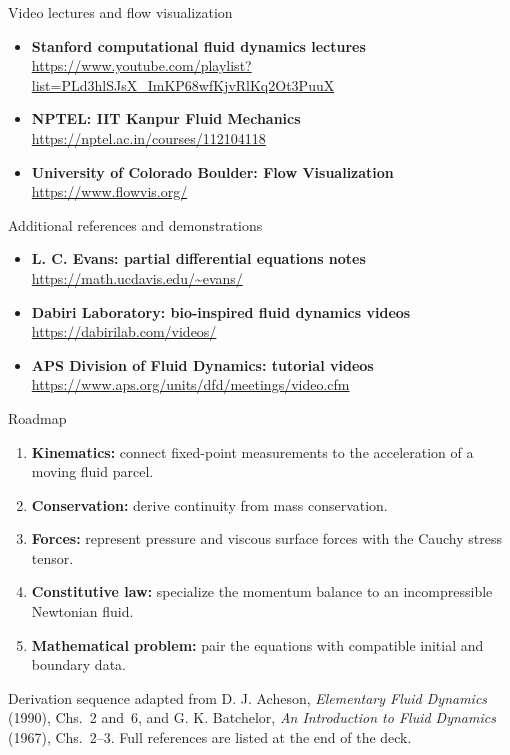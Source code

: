 \documentclass[aspectratio=169,11pt]{beamer}
\begin{document}
\begin{frame}{Video lectures and flow visualization}
\small
\begin{itemize}\itemsep9pt
  \item \textbf{Stanford computational fluid dynamics lectures}\\
  \url{https://www.youtube.com/playlist?list=PLd3hlSJsX_ImKP68wfKjvRlKq2Ot3PuuX}
  \item \textbf{NPTEL: IIT Kanpur Fluid Mechanics}\\
  \url{https://nptel.ac.in/courses/112104118}
  \item \textbf{University of Colorado Boulder: Flow Visualization}\\
  \url{https://www.flowvis.org/}
\end{itemize}
\end{frame}

\begin{frame}{Additional references and demonstrations}
\small
\begin{itemize}\itemsep9pt
  \item \textbf{L. C. Evans: partial differential equations notes}\\
  \url{https://math.ucdavis.edu/~evans/}
  \item \textbf{Dabiri Laboratory: bio-inspired fluid dynamics videos}\\
  \url{https://dabirilab.com/videos/}
  \item \textbf{APS Division of Fluid Dynamics: tutorial videos}\\
  \url{https://www.aps.org/units/dfd/meetings/video.cfm}
\end{itemize}
\end{frame}

\begin{frame}{Roadmap}
\large
\begin{enumerate}\itemsep8pt
  \item \textbf{Kinematics:} connect fixed-point measurements to the acceleration of a moving fluid parcel.
  \item \textbf{Conservation:} derive continuity from mass conservation.
  \item \textbf{Forces:} represent pressure and viscous surface forces with the Cauchy stress tensor.
  \item \textbf{Constitutive law:} specialize the momentum balance to an incompressible Newtonian fluid.
  \item \textbf{Mathematical problem:} pair the equations with compatible initial and boundary data.
\end{enumerate}
\vfill
{\scriptsize\color{DarkGray} Derivation sequence adapted from D. J. Acheson, \emph{Elementary Fluid Dynamics} (1990), Chs.~2 and~6, and G. K. Batchelor, \emph{An Introduction to Fluid Dynamics} (1967), Chs.~2--3. Full references are listed at the end of the deck.\par}
\end{frame}
\end{document}
